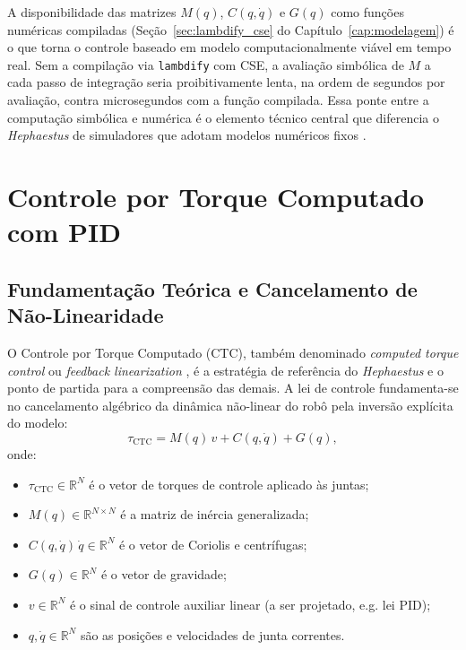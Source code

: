 A disponibilidade das matrizes $M(q)$, $C(q,\dot{q})$ e $G(q)$ como funções numéricas compiladas (Seção~\ref{sec:lambdify_cse} do Capítulo~\ref{cap:modelagem}) é o que torna o controle baseado em modelo computacionalmente viável em tempo real. Sem a compilação via \texttt{lambdify} com CSE, a avaliação simbólica de $M$ a cada passo de integração seria proibitivamente lenta, na ordem de segundos por avaliação, contra microsegundos com a função compilada. Essa ponte entre a computação simbólica e numérica é o elemento técnico central que diferencia o \textit{Hephaestus} de simuladores que adotam modelos numéricos fixos \cite{leu1986automated}.

\section{Controle por Torque Computado com PID}
\label{sec:ctc_pid_cap5}

\subsection{Fundamentação Teórica e Cancelamento de Não-Linearidade}

O Controle por Torque Computado (CTC), também denominado \textit{computed torque control} ou \textit{feedback linearization} \cite{isidori1985nonlinear, khalil2002nonlinear}, é a estratégia de referência do \textit{Hephaestus} e o ponto de partida para a compreensão das demais. A lei de controle fundamenta-se no cancelamento algébrico da dinâmica não-linear do robô pela inversão explícita do modelo:
\begin{equation}
    \tau_{\text{CTC}} = M(q)\,v + C(q,\dot{q}) + G(q),
    \label{eq:ctc_geral}
\end{equation}
onde:
\begin{itemize}
    \item $\tau_{\text{CTC}} \in \mathbb{R}^N$ é o vetor de torques de controle aplicado às juntas;
    \item $M(q) \in \mathbb{R}^{N \times N}$ é a matriz de inércia generalizada;
    \item $C(q,\dot{q})\,\dot{q} \in \mathbb{R}^N$ é o vetor de Coriolis e centrífugas;
    \item $G(q) \in \mathbb{R}^N$ é o vetor de gravidade;
    \item $v \in \mathbb{R}^N$ é o sinal de controle auxiliar linear (a ser projetado, e.g. lei PID);
    \item $q, \dot{q} \in \mathbb{R}^N$ são as posições e velocidades de junta correntes.
\end{itemize}

